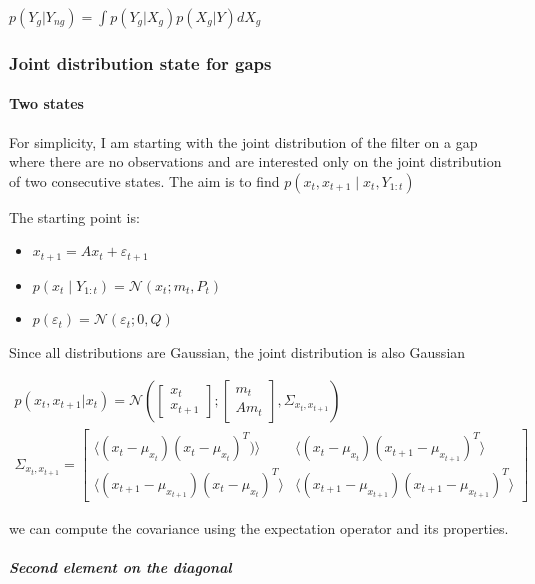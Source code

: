 \documentclass{article}
\newcommand{\E}[1]{\langle #1 \rangle} %
\newcommand{\norm}[3]{\mathcal{N}\left(#1; #2, #3\right)} %
\let\Oldsubsubsection\subsubsection
\renewcommand{\subsubsection}{\FloatBarrier\Oldsubsubsection}
\begin{document}
$p(Y_g|Y_{ng}) = \int p(Y_g|X_g)p(X_g|Y)dX_g$


\subsubsection{Joint distribution state for gaps}

\paragraph{Two states}

For simplicity, I am starting with the joint distribution of the filter on a gap where there are no observations and are interested only on the joint distribution of two consecutive states.
The aim is to find $p(x_t, x_{t+1}\mid x_t, Y_{1:t})$

The starting point is:
\begin{itemize}
    \item $x_{t+1} = Ax_{t} + \varepsilon_{t+1}$
    \item $p(x_t \mid Y_{1:t}) = \norm{x_t}{m_t}{P_t}$
    \item $p(\varepsilon_t) = \norm{\varepsilon_t}{0}{Q}$
\end{itemize}

Since all distributions are Gaussian, the joint distribution is also Gaussian


\begin{multline}\label{p_X2_start}
p(x_t, x_{t+1}|x_t) = \norm{\begin{bmatrix}x_t\\x_{t+1}\end{bmatrix}}{\begin{bmatrix}m_t\\Am_t\end{bmatrix}}{\Sigma_{x_t, x_{t+1}}} \\
\Sigma_{x_t, x_{t+1}} = \begin{bmatrix}\E{(x_t-\mu_{x_t})(x_t-\mu_{x_t})^T)}&\E{(x_t-\mu_{x_t})(x_{t+1}-\mu_{x_{t+1}})^T}\\\E{(x_{t+1}-\mu_{x_{t+1}})(x_{t}-\mu_{x_{t}})^T}&\E{(x_{t+1}-\mu_{x_{t+1}})(x_{t+1}-\mu_{x_{t+1}})^T}\end{bmatrix}
\end{multline}

we can compute the covariance using the expectation operator and its properties.

\subparagraph{Second element on the diagonal}
\end{document}
